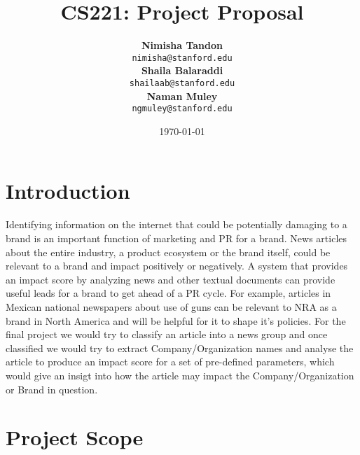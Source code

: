 \documentclass{article}
\title{CS221: Project Proposal} %
\author{	\textbf{Nimisha Tandon}\\  \texttt{nimisha@stanford.edu} \\
		\textbf{Shaila Balaraddi}\\  \texttt{shailaab@stanford.edu} \\ 
		\textbf{Naman Muley}\\      \texttt{ngmuley@stanford.edu}}%
\date{\today} %
\begin{document}
\maketitle %


\section*{Introduction} %

Identifying information on the internet that could be potentially damaging to a brand is an important function of marketing and PR for a brand. News articles about the entire industry, a product ecosystem or the brand itself, could be relevant to a brand and impact positively or negatively. A system that provides an impact score by analyzing news and other textual documents can provide useful leads for a brand to get ahead of a PR cycle. For example, articles in Mexican national newspapers about use of guns can be relevant to NRA as a brand in North America and will be helpful for it to shape it's policies.\newline \newline
For the final project we would try to classify an article into a news group and once classified we would try to extract Company/Organization names and analyse the article to produce an impact score for a set of pre-defined parameters, which would give an insigt into how the article may impact the Company/Organization or Brand in question.


\maketitle %

\section*{Project Scope} %
\end{document}
